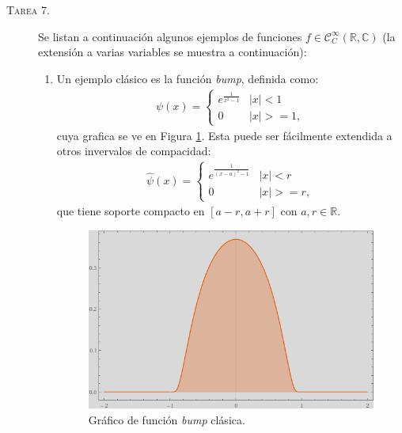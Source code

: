 \documentclass[spanish, fleqn]{article}
\begin{document}
\begin{description}
 
	\item[\textsc{Tarea 7.}] Se listan a continuación algunos ejemplos de funciones $f \in \mathcal{C}_{C}^{\infty}(\mathbb{R},\mathbb{C})$ (la extensión a varias variables se muestra a continuación):
	\begin{enumerate}
		\item Un ejemplo clásico es la función \textit{bump}, definida como:
		\begin{align*}
		\psi(x) =
		\begin{cases}
		e^{\frac{1}{x^2-1}} & |x|<1 \\
		0 & |x|>= 1,
		\end{cases}	
		\end{align*}
		cuya grafica se ve en Figura \ref{fig:cbump}. Esta puede ser fácilmente extendida a otros invervalos de compacidad:
		\begin{align*}
		\widehat{\psi}(x) =
		\begin{cases}
		e^{\frac{1}{(x-a)^2-1}} & |x|<r \\
		0 & |x|>= r,
		\end{cases}	
		\end{align*}
		que tiene soporte compacto en $[a-r, a+r]$ con $a,r \in \mathbb{R}$. 

	\begin{figure}[htpb!]
	\centering
	\includegraphics[width=10cm]{bump}
	\caption{Gráfico de función \textit{bump} clásica.}
	\label{fig:cbump}
	\end{figure}


\end{enumerate}
\end{description}
\end{document}
